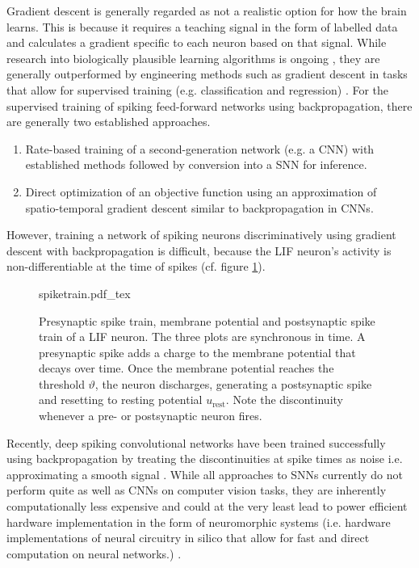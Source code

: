 Gradient descent is generally regarded as not a realistic option for how the brain learns. This is because it requires a teaching signal in the form of labelled data and calculates a gradient specific to each neuron based on that signal. While research into biologically plausible learning algorithms is ongoing \cite{bing2018survey,bartunov2018assessing}, they are generally outperformed by engineering methods such as gradient descent in tasks that allow for supervised training (e.g. classification and regression) \cite{diehl2015unsupervised}.
For the supervised training of spiking feed-forward networks using backpropagation, there are generally two established approaches.
\begin{enumerate}
    \item Rate-based training of a second-generation network (e.g. a CNN) with established methods followed by conversion into a SNN for inference.
    \item Direct optimization of an objective function using an approximation of spatio-temporal gradient descent similar to backpropagation in CNNs.
\end{enumerate}
However, training a network of spiking neurons discriminatively using gradient descent with backpropagation is difficult, because the LIF neuron's activity is non-differentiable at the time of spikes (cf. figure \ref{fig:spiketrain}).
\begin{figure}[H]
    \centering
\def\svgwidth{\textwidth}
{spiketrain.pdf_tex}
\caption[Presynaptic spike train, membrane potential and postsynaptic spike train of a LIF neuron]{Presynaptic spike train, membrane potential and postsynaptic spike train of a LIF neuron. The three plots are synchronous in time. A presynaptic spike adds a charge to the membrane potential that decays over time. Once the membrane potential reaches the threshold $\vartheta$, the neuron discharges, generating a postsynaptic spike and resetting to resting potential $u_\mathrm{rest}$. Note the discontinuity whenever a pre- or postsynaptic neuron fires.}\label{fig:spiketrain}
\end{figure}\noindent
Recently, deep spiking convolutional networks have been trained successfully using backpropagation by treating the discontinuities at spike times as noise i.e. approximating a smooth signal \cite{10.3389/fnins.2016.00508, panda2016unsupervised}. While all approaches to SNNs currently do not perform quite as well as CNNs on computer vision tasks, they are inherently computationally less expensive and could at the very least lead to power efficient hardware implementation in the form of neuromorphic systems (i.e. hardware implementations of neural circuitry in silico that allow for fast and direct computation on neural networks.) \cite{hopkins2018spiking}.
